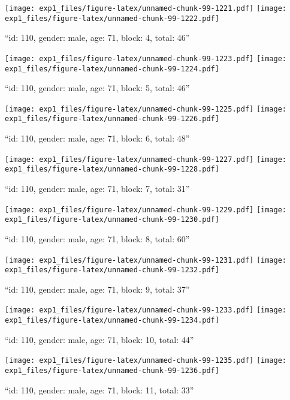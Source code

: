 \documentclass[,]{article}
\begin{document}
\texttt{[image: exp1\_files/figure-latex/unnamed-chunk-99-1221.pdf]}
\texttt{[image: exp1\_files/figure-latex/unnamed-chunk-99-1222.pdf]}

\newpage
[1] 

``id: 110, gender: male, age: 71, block: 4, total: 46''

\texttt{[image: exp1\_files/figure-latex/unnamed-chunk-99-1223.pdf]}
\texttt{[image: exp1\_files/figure-latex/unnamed-chunk-99-1224.pdf]}

\newpage
[1] 

``id: 110, gender: male, age: 71, block: 5, total: 46''

\texttt{[image: exp1\_files/figure-latex/unnamed-chunk-99-1225.pdf]}
\texttt{[image: exp1\_files/figure-latex/unnamed-chunk-99-1226.pdf]}

\newpage
[1] 

``id: 110, gender: male, age: 71, block: 6, total: 48''

\texttt{[image: exp1\_files/figure-latex/unnamed-chunk-99-1227.pdf]}
\texttt{[image: exp1\_files/figure-latex/unnamed-chunk-99-1228.pdf]}

\newpage
[1] 

``id: 110, gender: male, age: 71, block: 7, total: 31''

\texttt{[image: exp1\_files/figure-latex/unnamed-chunk-99-1229.pdf]}
\texttt{[image: exp1\_files/figure-latex/unnamed-chunk-99-1230.pdf]}

\newpage
[1] 

``id: 110, gender: male, age: 71, block: 8, total: 60''

\texttt{[image: exp1\_files/figure-latex/unnamed-chunk-99-1231.pdf]}
\texttt{[image: exp1\_files/figure-latex/unnamed-chunk-99-1232.pdf]}

\newpage
[1] 

``id: 110, gender: male, age: 71, block: 9, total: 37''

\texttt{[image: exp1\_files/figure-latex/unnamed-chunk-99-1233.pdf]}
\texttt{[image: exp1\_files/figure-latex/unnamed-chunk-99-1234.pdf]}

\newpage
[1] 

``id: 110, gender: male, age: 71, block: 10, total: 44''

\texttt{[image: exp1\_files/figure-latex/unnamed-chunk-99-1235.pdf]}
\texttt{[image: exp1\_files/figure-latex/unnamed-chunk-99-1236.pdf]}

\newpage
[1] 

``id: 110, gender: male, age: 71, block: 11, total: 33''
\end{document}
